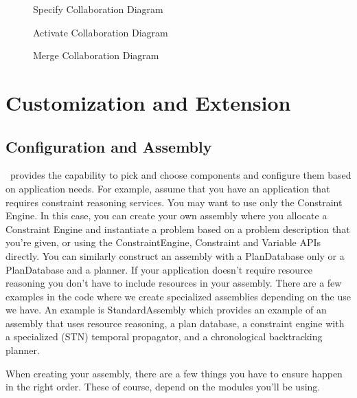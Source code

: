 \documentclass[10pt, letterpaper, twoside]{article}
\begin{document}
\begin{figure}[htb]
\centering{}
\caption{Specify Collaboration Diagram}
\label{SpecifyDiagram}
\end{figure}

\begin{figure}[hbt]
\centering{}
\caption{Activate Collaboration Diagram}
\label{ActivateDiagram}
\end{figure}

\begin{figure}[hbt]
\centering{}
\caption{Merge Collaboration Diagram}
\label{MergeDiagram}
\end{figure}

\section{Customization and Extension}
\subsection{Configuration and Assembly}
\label{assembly}

\ET\, provides the capability to pick and choose components and configure
them based on application needs.  For example, assume that you have an
application that requires constraint reasoning services.  You may want to
use only the Constraint Engine.  In this case, you can create your own
assembly where you allocate a Constraint Engine and instantiate a problem
based on a problem description that you're given, or using the
ConstraintEngine, Constraint and Variable APIs directly. You can similarly
construct an assembly with a PlanDatabase only or a PlanDatabase and a
planner. If your application doesn't require resource reasoning you don't
have to include resources in your assembly. There are a few examples in the
code where we create specialized assemblies depending on the use we have.
An example is StandardAssembly which provides an example of an assembly
that uses resource reasoning, a plan database, a constraint engine with a
specialized (STN) temporal propagator, and a chronological backtracking
planner.

When creating your assembly, there are a few things you have to ensure happen
in the right order.  These of course, depend on the modules you'll be
using. 
\end{document}
